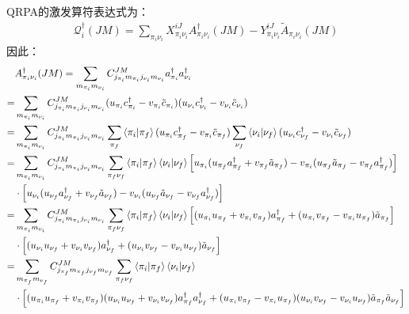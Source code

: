 \documentclass[master]{shnuthesis}
\begin{document}
QRPA的激发算符表达式为：
\begin{align}
    \mathcal{Q}_i^\dagger(JM) = \sum_{\pi_i\nu_i} X_{\pi_i\nu_i}^{iJ} A_{\pi_i\nu_i}^\dagger(JM) - Y_{\pi_i\nu_i}^{iJ} \tilde{A}_{\pi_i\nu_i}(JM) \label{QiJM}
\end{align}
因此：
\begin{align}
    & A_{\pi_i\nu_i}^\dagger(JM) = \sum_{m_{\pi_i}m_{\nu_i}} C_{j_{\pi_i} m_{\pi_i} j_{\nu_i} m_{\nu_i}}^{JM} a_{\pi_i}^\dagger a_{\nu_i}^\dagger \notag\\
    = & \sum_{m_{\pi_i}m_{\nu_i}} C_{j_{\pi_i} m_{\pi_i} j_{\nu_i} m_{\nu_i}}^{JM} (u_{\pi_i}c_{\pi_i}^\dagger-v_{\pi_i}\tilde{c}_{\pi_i})(u_{\nu_i}c_{\nu_i}^\dagger-v_{\nu_i}\tilde{c}_{\nu_i}) \notag\\
    = & \sum_{m_{\pi_i}m_{\nu_i}} C_{j_{\pi_i} m_{\pi_i} j_{\nu_i} m_{\nu_i}}^{JM} \sum_{\pi_f}\left\langle \pi_i|\pi_f \right\rangle (u_{\pi_i}c_{\pi_f}^\dagger-v_{\pi_i}\tilde{c}_{\pi_f}) \sum_{\nu_f}\left\langle \nu_i|\nu_f \right\rangle (u_{\nu_i}c_{\nu_f}^\dagger-v_{\nu_i}\tilde{c}_{\nu_f}) \notag\\
    = & \sum_{m_{\pi_i}m_{\nu_i}} C_{j_{\pi_i} m_{\pi_i} j_{\nu_i} m_{\nu_i}}^{JM} \sum_{\pi_f \nu_f} \left\langle \pi_i|\pi_f \right\rangle \left\langle \nu_i|\nu_f \right\rangle \left[u_{\pi_i}(u_{\pi_f}a_{\pi_f}^\dagger+v_{\pi_f}\tilde{a}_{\pi_f})-v_{\pi_i}(u_{\pi_f}\tilde{a}_{\pi_f}-v_{\pi_f}a_{\pi_f}^\dagger)\right] \notag\\
    & \cdot \left[u_{\nu_i}(u_{\nu_f}a_{\nu_f}^\dagger+v_{\nu_f}\tilde{a}_{\nu_f})-v_{\nu_i}(u_{\nu_f}\tilde{a}_{\nu_f}-v_{\nu_f}a_{\nu_f}^\dagger)\right] \notag\\
    = & \sum_{m_{\pi_i}m_{\nu_i}} C_{j_{\pi_i} m_{\pi_i} j_{\nu_i} m_{\nu_i}}^{JM} \sum_{\pi_f \nu_f} \left\langle \pi_i|\pi_f \right\rangle \left\langle \nu_i|\nu_f \right\rangle \left[(u_{\pi_i}u_{\pi_f}+v_{\pi_i}v_{\pi_f})a_{\pi_f}^\dagger+(u_{\pi_i}v_{\pi_f}-v_{\pi_i}u_{\pi_f})\tilde{a}_{\pi_f}\right] \notag\\
    & \cdot \left[(u_{\nu_i}u_{\nu_f}+v_{\nu_i}v_{\nu_f})a_{\nu_f}^\dagger+(u_{\nu_i}v_{\nu_f}-v_{\nu_i}u_{\nu_f})\tilde{a}_{\nu_f}\right] \notag\\
    = & \sum_{m_{\pi_f}m_{\nu_f}} C_{j_{\pi_f} m_{\pi_f} j_{\nu_f} m_{\nu_f}}^{JM} \sum_{\pi_f \nu_f} \left\langle \pi_i|\pi_f \right\rangle \left\langle \nu_i|\nu_f \right\rangle \notag\\
    & \cdot \left[(u_{\pi_i}u_{\pi_f}+v_{\pi_i}v_{\pi_f})(u_{\nu_i}u_{\nu_f}+v_{\nu_i}v_{\nu_f})a_{\pi_f}^\dagger a_{\nu_f}^\dagger+(u_{\pi_i}v_{\pi_f}-v_{\pi_i}u_{\pi_f})(u_{\nu_i}v_{\nu_f}-v_{\nu_i}u_{\nu_f})\tilde{a}_{\pi_f}\tilde{a}_{\nu_f}\right] \notag\\

\end{align}
\end{document}
